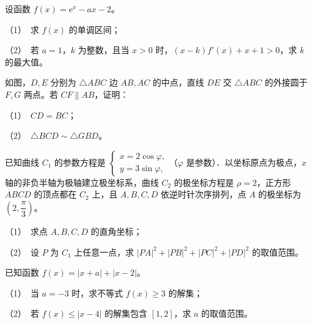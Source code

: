 \begin{question}
设函数 $f(x)=\mathrm e^x-ax-2$。

（1）　求 $f(x)$ 的单调区间；

（2）　若 $a=1$，$k$ 为整数，且当 $x>0$ 时，$(x-k)f'(x)+x+1>0$，求 $k$ 的最大值。

\Needspace{0.4\textheight}
\end{question}
\begin{question}
如图，$D,E$ 分别为 $\triangle ABC$ 边 $AB,AC$ 的中点，直线 $DE$ 交 $\triangle ABC$ 的外接圆于 $F,G$ 两点。若 $CF\parallel AB$，证明：

（1）　$CD=BC$；

（2）　$\triangle BCD\sim\triangle GBD$。
\nopagebreak[4]
\begin{center}\end{center}
\nopagebreak[4]
\end{question}
\begin{question}
已知曲线 $C_1$ 的参数方程是 $\begin{cases}x=2\cos\varphi,\\y=3\sin\varphi,\end{cases}$（$\varphi$ 是参数）．以坐标原点为极点，$x$ 轴的非负半轴为极轴建立极坐标系，曲线 $C_2$ 的极坐标方程是 $\rho=2$，正方形 $ABCD$ 的顶点都在 $C_2$ 上，且 $A,B,C,D$ 依逆时针次序排列，点 $A$ 的极坐标为 $(2,\dfrac\pi3)$。

（1）　求点 $A,B,C,D$ 的直角坐标；

（2）　设 $P$ 为 $C_1$ 上任意一点，求 $|PA|^2+|PB|^2+|PC|^2+|PD|^2$ 的取值范围。

\end{question}
\begin{question}
已知函数 $f(x)=|x+a|+|x-2|$。

（1）　当 $a=-3$ 时，求不等式 $f(x)\geqslant3$ 的解集；

（2）　若 $f(x)\leqslant|x-4|$ 的解集包含 $[1,2]$，求 $a$ 的取值范围。

\end{question}